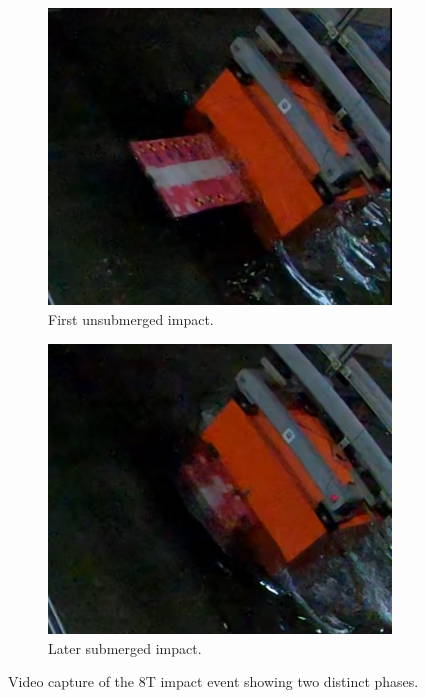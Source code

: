 \documentclass{article}
\begin{document}
{\begin{figure}[htbp]
    \centering
    \begin{subfigure}[b]{0.6\textwidth}
        \centering
        \includegraphics[width=\textwidth]{first_impact.jpg}
        \caption{First unsubmerged impact.}
        \label{fig:first_impact}
    \end{subfigure}
    \hfill
    
    \begin{subfigure}[b]{0.6\textwidth}
        \centering
        \includegraphics[width=\textwidth]{second_impact.jpg}
        \caption{Later submerged impact.}
        \label{fig:second_impact}
    \end{subfigure}
    \caption{Video capture of the 8T impact event showing two distinct phases.}
    \label{fig:impact_combined}
    

\end{figure}}
\end{document}
